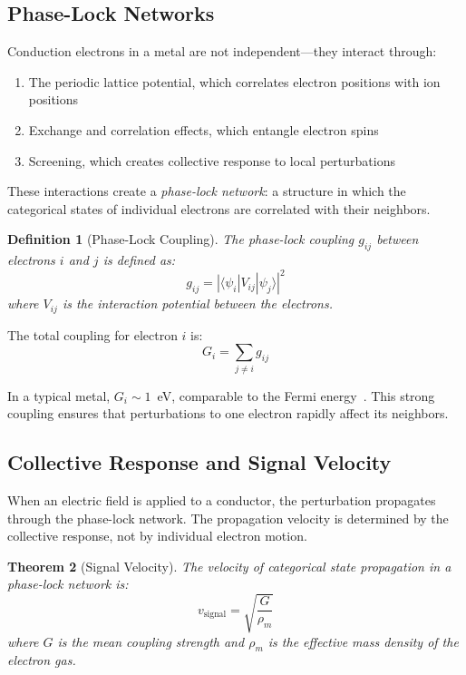 \documentclass[twocolumn,showpacs,preprintnumbers,amsmath,amssymb,prd]{revtex4-2}
\newtheorem{theorem}{Theorem}[section]
\newtheorem{definition}[theorem]{Definition}
\begin{document}
\subsection{Phase-Lock Networks}

Conduction electrons in a metal are not independent---they interact through:
\begin{enumerate}
\item The periodic lattice potential, which correlates electron positions with ion positions
\item Exchange and correlation effects, which entangle electron spins
\item Screening, which creates collective response to local perturbations
\end{enumerate}

These interactions create a \emph{phase-lock network}: a structure in which the categorical states of individual electrons are correlated with their neighbors.

\begin{definition}[Phase-Lock Coupling]
\label{def:phase_lock}
The phase-lock coupling $g_{ij}$ between electrons $i$ and $j$ is defined as:
\begin{equation}
g_{ij} = |\langle \psi_i | V_{ij} | \psi_j \rangle|^2
\label{eq:coupling_strength}
\end{equation}
where $V_{ij}$ is the interaction potential between the electrons.
\end{definition}

The total coupling for electron $i$ is:
\begin{equation}
G_i = \sum_{j \neq i} g_{ij}
\label{eq:total_coupling}
\end{equation}

In a typical metal, $G_i \sim 1$~eV, comparable to the Fermi energy~\cite{Ashcroft1976}. This strong coupling ensures that perturbations to one electron rapidly affect its neighbors.

\subsection{Collective Response and Signal Velocity}

When an electric field is applied to a conductor, the perturbation propagates through the phase-lock network. The propagation velocity is determined by the collective response, not by individual electron motion.

\begin{theorem}[Signal Velocity]
\label{thm:signal_velocity}
The velocity of categorical state propagation in a phase-lock network is:
\begin{equation}
v_{\text{signal}} = \sqrt{\frac{G}{\rho_m}}
\label{eq:signal_velocity}
\end{equation}
where $G$ is the mean coupling strength and $\rho_m$ is the effective mass density of the electron gas.
\end{theorem}
\end{document}
